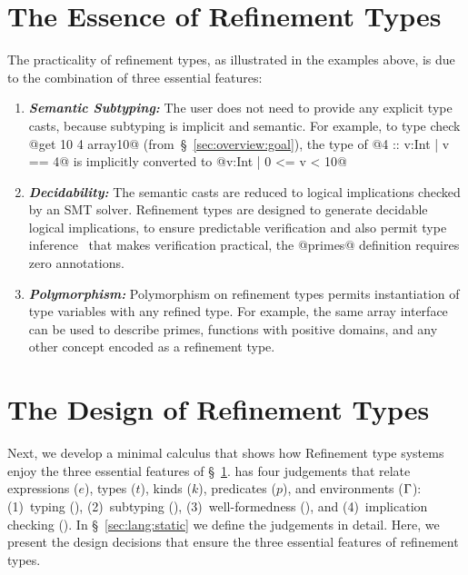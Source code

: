 \section{The Essence of Refinement Types} \label{sec:overview:essence}
%
The practicality of refinement types, as illustrated in the examples above,
is due to the combination of three essential features:
%
\begin{enumerate}[leftmargin=*]

\item \textbf{\textit{Semantic Subtyping:}}
The user does not need to provide any explicit type casts, because
subtyping is implicit and semantic.
%
For example, to type check @get 10 4 array10@ (from~\S~\ref{sec:overview:goal}),
the type of @4 :: {v:Int | v == 4}@ is implicitly converted to @{v:Int | 0 <= v < 10}@

\item \textbf{\textit{Decidability:}}
%
The semantic casts are reduced to logical implications checked by an SMT solver.
Refinement types are designed to generate decidable logical implications,
to ensure predictable verification and also permit type inference~\cite{LiquidPLDI08}
that makes verification practical, \eg the @primes@ definition requires zero annotations.

\item \textbf{\textit{Polymorphism:}}
Polymorphism on refinement types permits instantiation of type variables with any refined type.
For example, the same array interface can be used to describe primes,
functions with positive domains, and any other concept encoded as a refinement type.
\end{enumerate}

\section{The Design of Refinement Types}
\label{sec:overview:design}

Next, we develop a minimal calculus \sysrf that shows how
Refinement type systems enjoy the three essential features
of \S~\ref{sec:overview:essence}.
%
\sysrf has four judgements that relate expressions ($e$),
types ($t$), kinds ($k$), predicates ($p$), and environments ($\mathrm{\Gamma}$):
%
(1)~typing (),
%
(2)~subtyping (),
%
(3)~well-formedness (\isWellFormed{\tcenv}{\stype}{\skind}),
and
(4)~implication checking ().
%
In \S~\ref{sec:lang:static} we define the judgements in detail.
%
Here, we present the design decisions that ensure the three
essential features of refinement types.


